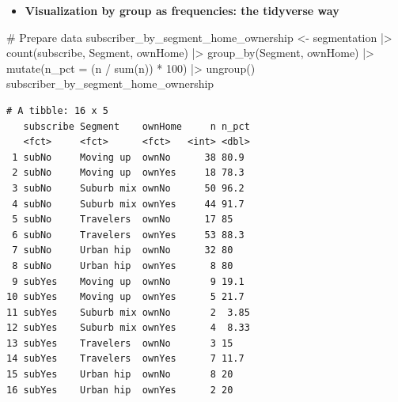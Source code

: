 \documentclass[
  ignorenonframetext,
]{beamer}
\newenvironment{Shaded}{\begin{snugshade}}{\end{snugshade}}
\newcommand{\AttributeTok}[1]{\textcolor[rgb]{0.40,0.45,0.13}{#1}}
\newcommand{\CommentTok}[1]{\textcolor[rgb]{0.37,0.37,0.37}{#1}}
\newcommand{\DecValTok}[1]{\textcolor[rgb]{0.68,0.00,0.00}{#1}}
\newcommand{\FunctionTok}[1]{\textcolor[rgb]{0.28,0.35,0.67}{#1}}
\newcommand{\NormalTok}[1]{\textcolor[rgb]{0.00,0.23,0.31}{#1}}
\newcommand{\OtherTok}[1]{\textcolor[rgb]{0.00,0.23,0.31}{#1}}
\newcommand{\SpecialCharTok}[1]{\textcolor[rgb]{0.37,0.37,0.37}{#1}}
\providecommand{\tightlist}{%
  \setlength{\itemsep}{0pt}\setlength{\parskip}{0pt}}\usepackage{longtable,booktabs,array}
\begin{document}
\begin{frame}[fragile]{}
\label{section-13}
\begin{itemize}
\tightlist
\item
  \textbf{Visualization by group as frequencies: the tidyverse way}
\end{itemize}

\tiny

\begin{Shaded}
\begin{Highlighting}[]
\CommentTok{\# Prepare data}
\NormalTok{subscriber\_by\_segment\_home\_ownership }\OtherTok{\textless{}{-}}\NormalTok{ segmentation }\SpecialCharTok{|\textgreater{}}
  \FunctionTok{count}\NormalTok{(subscribe, Segment, ownHome) }\SpecialCharTok{|\textgreater{}}
  \FunctionTok{group\_by}\NormalTok{(Segment, ownHome) }\SpecialCharTok{|\textgreater{}}
  \FunctionTok{mutate}\NormalTok{(}\AttributeTok{n\_pct =}\NormalTok{ (n }\SpecialCharTok{/} \FunctionTok{sum}\NormalTok{(n)) }\SpecialCharTok{*} \DecValTok{100}\NormalTok{) }\SpecialCharTok{|\textgreater{}}
  \FunctionTok{ungroup}\NormalTok{()}
\NormalTok{subscriber\_by\_segment\_home\_ownership}
\end{Highlighting}
\end{Shaded}

\begin{verbatim}
# A tibble: 16 x 5
   subscribe Segment    ownHome     n n_pct
   <fct>     <fct>      <fct>   <int> <dbl>
 1 subNo     Moving up  ownNo      38 80.9 
 2 subNo     Moving up  ownYes     18 78.3 
 3 subNo     Suburb mix ownNo      50 96.2 
 4 subNo     Suburb mix ownYes     44 91.7 
 5 subNo     Travelers  ownNo      17 85   
 6 subNo     Travelers  ownYes     53 88.3 
 7 subNo     Urban hip  ownNo      32 80   
 8 subNo     Urban hip  ownYes      8 80   
 9 subYes    Moving up  ownNo       9 19.1 
10 subYes    Moving up  ownYes      5 21.7 
11 subYes    Suburb mix ownNo       2  3.85
12 subYes    Suburb mix ownYes      4  8.33
13 subYes    Travelers  ownNo       3 15   
14 subYes    Travelers  ownYes      7 11.7 
15 subYes    Urban hip  ownNo       8 20   
16 subYes    Urban hip  ownYes      2 20   
\end{verbatim}
\end{frame}
\end{document}
